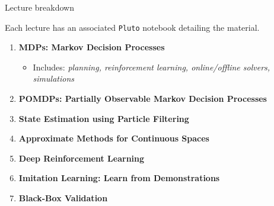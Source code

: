 
\begin{frame}[fragile]{Lecture breakdown}

\begin{highlightblock}
Each lecture has an associated \texttt{Pluto} notebook detailing the material.
\end{highlightblock}

\phantom{}

\begin{enumerate}
    \item \textbf{MDPs: Markov Decision Processes}
    \begin{itemize}
        \item Includes: \textit{planning, reinforcement learning, online/offline solvers, simulations}
    \end{itemize}
    \item \textbf{POMDPs: Partially Observable Markov Decision Processes}
    \item \textbf{State Estimation using Particle Filtering}
    \item \textbf{Approximate Methods for Continuous Spaces}
    \item \textbf{Deep Reinforcement Learning}
    \item \textbf{Imitation Learning: Learn from Demonstrations}
    \item \textbf{Black-Box Validation}
\end{enumerate}


\end{frame}